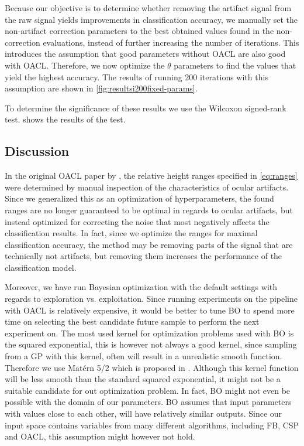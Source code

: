 Because our objective is to determine whether removing the artifact signal from the raw signal yields improvements in classification accuracy, we manually set the non-artifact correction parameters to the best obtained values found in the non-correction evaluations, instead of further increasing the number of iterations. This introduces the assumption that good parameters without OACL are also good with OACL. Therefore, we now optimize the $\theta$ parameters to find the values that yield the highest accuracy. The results of running 200 iterations with this assumption are shown in \cref{fig:resultsi200fixed-params}. 

To determine the significance of these results we use the Wilcoxon signed-rank test.  shows the results of the test.



\subsection{Discussion}\label{sec:discussion}
In the original OACL paper by \citep{li2015ocular}, the relative height ranges specified in \cref{eq:ranges} were determined by manual inspection of the characteristics of ocular artifacts. Since we generalized this as an optimization of hyperparameters, the found ranges are no longer guaranteed to be optimal in regards to ocular artifacts, but instead optimized for correcting the noise that most negatively affects the classification results. In fact, since we optimize the ranges for maximal classification accuracy, the method may be removing parts of the signal that are technically not artifacts, but removing them increases the performance of the classification model.

Moreover, we have run Bayesian optimization with the default settings with regards to exploration vs. exploitation. Since running experiments on the pipeline with OACL is relatively expensive, it would be better to tune BO to spend more time on selecting the best candidate future sample to perform the next experiment on. The most used kernel for optimization problems used with BO is the squared exponential, this is however not always a good kernel, since sampling from a GP with this kernel, often will result in a unrealistic smooth function. Therefore we use Matérn 5/2 which is proposed in \citep{snoek2012practical}. Although this kernel function will be less smooth than the standard squared exponential, it might not be a suitable candidate for out optimization problem. In fact, BO might not even be possible with the domain of our parameters. BO assumes that input parameters with values close to each other, will have relatively similar outputs. Since our input space contains variables from many different algorithms, including FB, CSP and OACL, this assumption might however not hold. 

